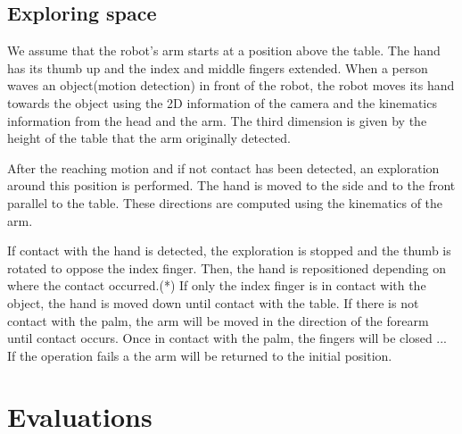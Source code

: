 \subsection{Exploring space}
\label{sec:impbehavior}


We assume that the robot's arm starts at a position above the
table. The hand has its thumb up and the index and middle fingers
extended. When a person waves an object(motion
detection\cite{kemp-thesis}) in front of the robot, the robot
moves its hand towards the object using the 2D information of the
camera and the kinematics information from the head and the arm.
The third dimension is given by the height of the table that the
arm originally detected.

After the reaching motion and if not contact has been detected, an
exploration around this position is performed. The hand is moved
to the side and to the front parallel to the table. These
directions are computed using the kinematics of the arm.

If contact with the hand is detected, the exploration is stopped
and the thumb is rotated to oppose the index finger. Then, the
hand is repositioned depending on where the contact occurred.(*)
If only the index finger is in contact with the object, the hand
is moved down until contact with the table.
%
If there is not contact with the palm, the arm will be moved in
the direction of the forearm until contact occurs.
%
Once in contact with the palm, the fingers will be closed ...
%
If the operation fails a the arm will be returned to the initial
position.


\section{Evaluations}
\label{sec:results}


